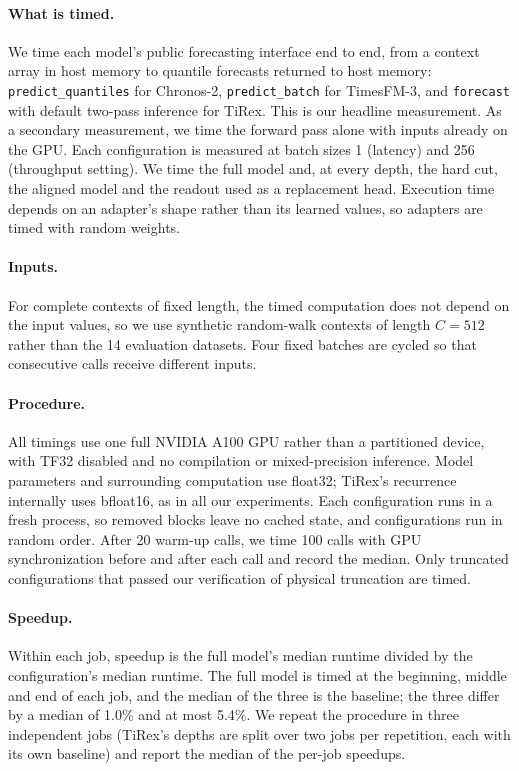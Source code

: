 \documentclass{article} %
\begin{document}
\paragraph{What is timed.}
We time each model's public forecasting interface end to end, from a context array in host memory
to quantile forecasts returned to host memory: \texttt{predict\_quantiles} for Chronos-2,
\texttt{predict\_batch} for TimesFM-3, and \texttt{forecast} with default two-pass inference for
TiRex. This is our headline measurement. As a secondary measurement, we time the forward pass alone
with inputs already on the GPU. Each configuration is measured at batch sizes 1 (latency) and 256
(throughput setting). We time the full model and, at every depth, the hard cut, the aligned model
and the readout used as a replacement head. Execution time depends on an adapter's shape rather
than its learned values, so adapters are timed with random weights.

\paragraph{Inputs.}
For complete contexts of fixed length, the timed computation does not depend on the input values,
so we use synthetic random-walk contexts of length $C=512$ rather than the 14 evaluation datasets.
Four fixed batches are cycled so that consecutive calls receive different inputs.

\paragraph{Procedure.}
All timings use one full NVIDIA A100 GPU rather than a partitioned device, with TF32 disabled and
no compilation or mixed-precision inference. Model parameters and surrounding computation use
float32; TiRex's recurrence internally uses bfloat16, as in all our experiments. Each configuration
runs in a fresh process, so removed blocks leave no cached state, and configurations run in random
order. After 20 warm-up calls, we time 100 calls with GPU synchronization before and after each
call and record the median. Only truncated configurations that passed our verification of physical
truncation are timed.

\paragraph{Speedup.}
Within each job, speedup is the full model's median runtime divided by the configuration's median
runtime. The full model is timed at the beginning, middle and end of each job, and the median of the
three is the baseline; the three differ by a median of 1.0\% and at most 5.4\%. We repeat the
procedure in three independent jobs (TiRex's depths are split over two jobs per repetition, each
with its own baseline) and report the median of the per-job speedups.
\end{document}
